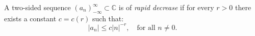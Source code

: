 A two-sided sequence $(a_n)_{-\infty}^{\infty} \subset \mathbb{C}$ is of \textit{rapid decrease} if for every $r > 0$ there exists a constant $c = c(r)$ such that:
\[
|a_n| \leq c |n|^{-r}, \quad \text{for all } n \neq 0.
\]
